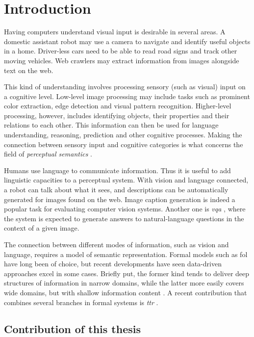 \glsresetall
\section{Introduction}
\label{sec:intro}

Having computers understand visual input is desirable in several areas.
A domestic assistant robot may use a camera to navigate and identify useful objects in a home.
Driver-less cars need to be able to read road signs and track other moving vehicles.
Web crawlers may extract information from images alongside text on the web.

This kind of understanding involves processing sensory (such as visual) input on a cognitive level.
Low-level image processing may include tasks such as prominent color extraction, edge detection and visual pattern recognition.
Higher-level processing, however, includes identifying objects, their properties and their relations to each other.
This information can then be used for language understanding, reasoning, prediction and other cognitive processes.
Making the connection between sensory input and cognitive categories is what concerns the field of \textit{perceptual semantics} \citep{PustejovskyPerceptualsemanticsconstruction1990}.

Humans use language to communicate information.
Thus it is useful to add linguistic capacities to a perceptual system.
With vision and language connected, a robot can talk about what it sees, and descriptions can be automatically generated for images found on the web.
Image caption generation is indeed a popular task for evaluating computer vision systems.
Another one is \textit{\gls{vqa}} \citep{AgrawalVQAVisualQuestion2015}, where the system is expected to generate answers to natural-language questions in the context of a given image.

The connection between different modes of information, such as vision and language, requires a model of semantic representation.
Formal models such as \gls{fol} have long been of choice, but recent developments have seen data-driven approaches excel in some cases.
Briefly put, the former kind tends to deliver deep structures of information in narrow domains, while the latter more easily covers wide domains, but with shallow information content \citep{Dobnik:2017ag}.
A recent contribution that combines several branches in formal systems is \textit{\gls{ttr}} \citep{CooperAustiniantruthattitudes2005,CooperTypetheorylanguage2016}.

\subsection{Contribution of this thesis}
\label{sec:contribution}

